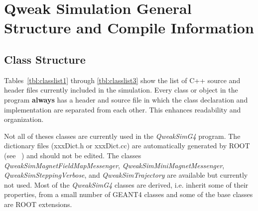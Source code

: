 \chapter{Qweak Simulation General Structure and Compile Information}\label{CHP_I}

\section{Class Structure} \label{CHP_I-SCN_I}

Tables~\ref{tbl:classlist1} through \ref{tbl:classlist3} show the list of
C++ source and header files currently included in the simulation.
Every class or object in the program {\bf always} has a header and
source file in which the class declaration and implementation are
separated from each other. This enhances readability and organization.

Not all of theses classes are currently used in the \textit{QweakSimG4}
program. The dictionary files (xxxDict.h or xxxDict.cc) are
automatically generated by ROOT (see ~\cite{tn:ROOT}) and should not
be edited. The classes {\em QweakSimMagnetFieldMapMessenger}, {\em
QweakSimMiniMagnetMessenger}, {\em QweakSimSteppingVerbose}, and {\em
QweakSimTrajectory} are available but currently not used.  Most of the
{\em QweakSimG4} classes are derived, i.e. inherit some of their
properties, from a small number of GEANT4 classes and some of the base
classes are ROOT extensions.

